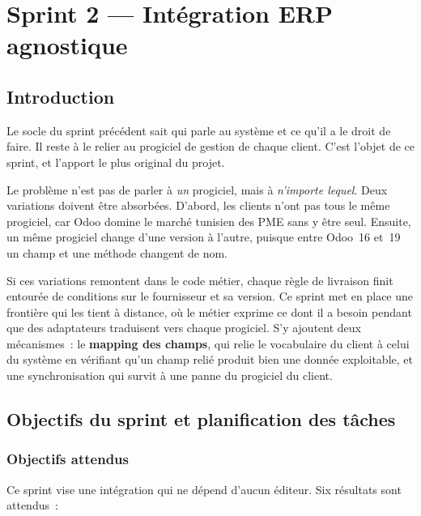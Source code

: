 %
\chapter{Sprint 2 — Intégration ERP agnostique}
\label{ch:erp}

\section{Introduction}

Le socle du sprint précédent sait qui parle au système et ce qu'il a le droit de faire. Il reste à le
relier au progiciel de gestion de chaque client. C'est l'objet de ce sprint, et l'apport le plus
original du projet.

Le problème n'est pas de parler à \emph{un} progiciel, mais à \emph{n'importe lequel}. Deux
variations doivent être absorbées. D'abord, les clients n'ont pas tous le même progiciel, car Odoo
domine le marché tunisien des PME sans y être seul. Ensuite, un même progiciel change d'une version à
l'autre, puisque entre Odoo~16 et~19 un champ et une méthode changent de nom.

Si ces variations remontent dans le code métier, chaque règle de livraison finit entourée de
conditions sur le fournisseur et sa version. Ce sprint met en place une frontière qui les tient à
distance, où le métier exprime ce dont il a besoin pendant que des adaptateurs traduisent vers chaque progiciel.
S'y ajoutent deux mécanismes~: le \textbf{mapping des champs}, qui relie le vocabulaire du client à
celui du système en vérifiant qu'un champ relié produit bien une donnée exploitable, et une
synchronisation qui survit à une panne du progiciel du client.

\section{Objectifs du sprint et planification des tâches}

\subsection{Objectifs attendus}

Ce sprint vise une intégration qui ne dépend d'aucun éditeur. Six résultats sont attendus~:

